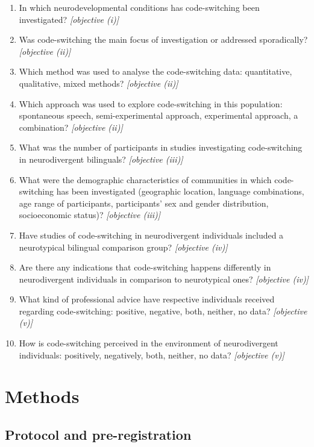 \documentclass[output=paper]{langscibook}
\begin{document}
\begin{enumerate}
  \item In which neurodevelopmental conditions has code-switching been investigated? \textit{[objective (i)]}
  \item Was code-switching the main focus of investigation or addressed sporadically? \textit{[objective (ii)]}
  \item Which method was used to analyse the code-switching data: quantitative, qualitative, mixed methods? \textit{[objective (ii)]}
  \item Which approach was used to explore code-switching in this population: spontaneous speech, semi-experimental approach, experimental approach, a combination? \textit{[objective (ii)]}
  \item What was the number of participants in studies investigating code-switching in neurodivergent bilinguals? \textit{[objective (iii)]}
  \item What were the demographic characteristics of communities in which code-switching has been investigated (geographic location, language combinations, age range of participants, participants’ sex and gender distribution, socioeconomic status)? \textit{[objective (iii)]}
  \item Have studies of code-switching in neurodivergent individuals included a neurotypical bilingual comparison group? \textit{[objective (iv)]}
  \item Are there any indications that code-switching happens differently in neurodivergent individuals in comparison to neurotypical ones? \textit{[objective (iv)]}
  \item What kind of professional advice have respective individuals received regarding code-switching: positive, negative, both, neither, no data? \textit{[objective (v)]}
  \item How is code-switching perceived in the environment of neurodivergent individuals: positively, negatively, both, neither, no data? \textit{[objective (v)]}
\end{enumerate}

\section{Methods}

\subsection{Protocol and pre-registration}
\end{document}

